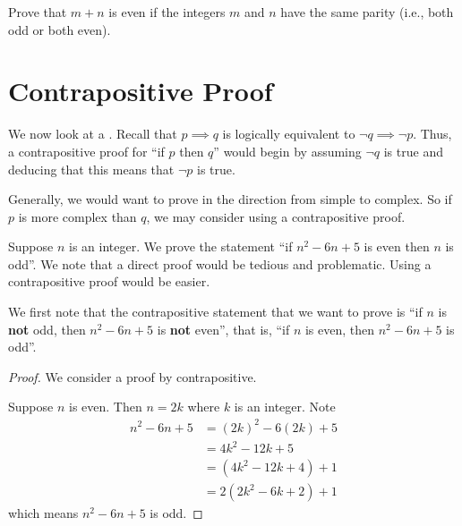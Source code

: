 \begin{exercise}
    Prove that $m + n$ is even if the integers $m$ and $n$ have the same parity (i.e., both odd or both even).
\end{exercise}

\section{Contrapositive Proof}
We now look at a . Recall that $p \implies q$ is logically equivalent to $\lnot q \implies \lnot p$. Thus, a contrapositive proof for ``if $p$ then $q$'' would begin by assuming $\lnot q$ is true and deducing that this means that $\lnot p$ is true.

Generally, we would want to prove in the direction from simple to complex. So if $p$ is more complex than $q$, we may consider using a contrapositive proof.

\begin{example}\label{example:if-(n-1)(n-5)-is-even-then-n-is-odd}
    \setlength{\parindent}{1.5em}

    Suppose $n$ is an integer. We prove the statement ``if $n^2 - 6n + 5$ is even then $n$ is odd''. We note that a direct proof would be tedious and problematic. Using a contrapositive proof would be easier.

    We first note that the contrapositive statement that we want to prove is ``if $n$ is \textbf{not} odd, then $n^2 - 6n + 5$ is \textbf{not} even'', that is, ``if $n$ is even, then $n^2 - 6n + 5$ is odd''.

    \begin{proof}
        We consider a proof by contrapositive.

        Suppose $n$ is even. Then $n = 2k$ where $k$ is an integer. Note
        \begin{align*}
            n^2 - 6n + 5 &= (2k)^2 - 6(2k) + 5\\
            &= 4k^2 - 12k + 5\\
            &= (4k^2 - 12k + 4) + 1\\
            &= 2(2k^2 - 6k + 2) + 1
        \end{align*}
        which means $n^2 - 6n + 5$ is odd.
    \end{proof}
\end{example}

